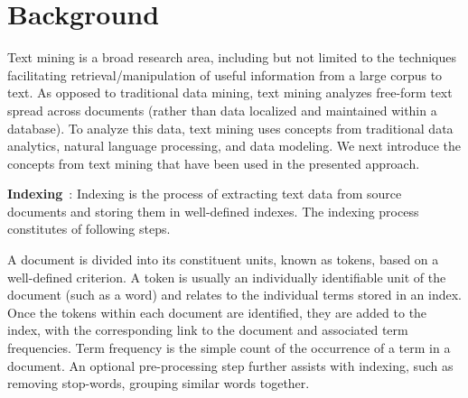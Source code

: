 \section{Background}
\label{sec:background}


Text mining is a broad research area, 
including but not limited to the techniques 
facilitating retrieval/manipulation of useful information from a large corpus to text. 
As opposed to traditional data mining, text mining analyzes
free-form text spread across documents
(rather than data localized and maintained within a database).
To analyze this data, text mining uses concepts from traditional
data analytics, natural language processing, and data modeling.
We next introduce the concepts from text mining that have been used in the presented approach.


\textbf{Indexing}~\cite{frakes1992introduction,manning2008introduction}:
Indexing is the process of extracting text data from source documents
and storing them in well-defined indexes.
The indexing process constitutes of following steps.

A document is divided into its constituent units, known as tokens, based on a well-defined criterion. A token is usually an individually identifiable unit of the document (such as a word) and relates to the individual terms stored in an index. Once the tokens within each document are identified, they are added to the index, with the corresponding link to the document and associated term frequencies.
Term frequency is the simple count of the occurrence of a term in a document.
An optional pre-processing step further assists with indexing, such as removing stop-words, grouping similar words together. 



